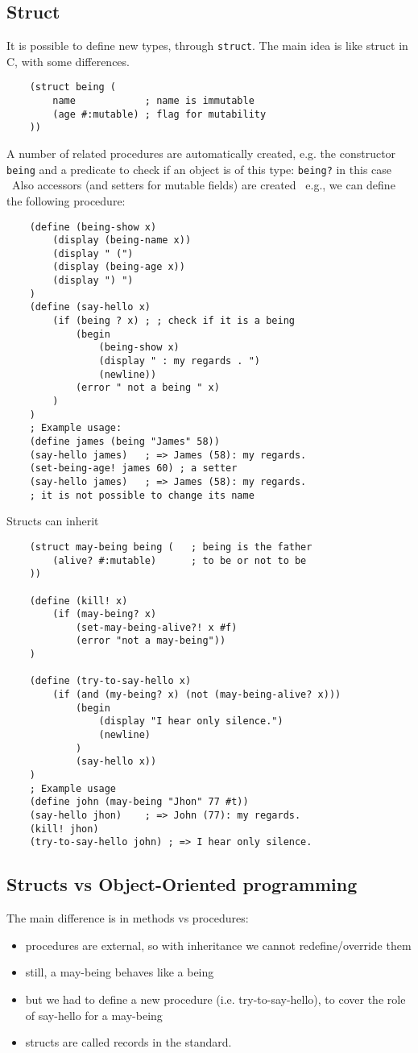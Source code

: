 \subsection{Struct}
It is possible to define new types, through \texttt{struct}.
The main idea is like struct in C, with some differences.
\begin{lstlisting}
    (struct being (
        name            ; name is immutable
        (age #:mutable) ; flag for mutability
    ))
\end{lstlisting}
A number of related procedures are automatically created, e.g. the constructor \texttt{being} and a predicate to check if an object is of this type: \texttt{being?} in this case \
Also accessors (and setters for mutable fields) are created \
e.g., we can define the following procedure:
\begin{lstlisting}
    (define (being-show x)
        (display (being-name x))
        (display " (")
        (display (being-age x))
        (display ") ")
    )
    (define (say-hello x)
        (if (being ? x) ; ; check if it is a being
            (begin
                (being-show x)
                (display " : my regards . ")
                (newline))
            (error " not a being " x)
        )
    )
    ; Example usage:
    (define james (being "James" 58))
    (say-hello james)   ; => James (58): my regards.
    (set-being-age! james 60) ; a setter
    (say-hello james)   ; => James (58): my regards.
    ; it is not possible to change its name
\end{lstlisting}
Structs can inherit
\begin{lstlisting}
    (struct may-being being (   ; being is the father
        (alive? #:mutable)      ; to be or not to be
    ))

    (define (kill! x)
        (if (may-being? x)
            (set-may-being-alive?! x #f)
            (error "not a may-being"))
    )

    (define (try-to-say-hello x)
        (if (and (my-being? x) (not (may-being-alive? x)))
            (begin
                (display "I hear only silence.")
                (newline)
            )
            (say-hello x))
    )
    ; Example usage
    (define john (may-being "Jhon" 77 #t))
    (say-hello jhon)    ; => John (77): my regards.
    (kill! jhon)
    (try-to-say-hello john) ; => I hear only silence.
\end{lstlisting}

\subsection{Structs vs Object-Oriented programming}
The main difference is in methods vs procedures:
\begin{itemize}
    \item procedures are external, so with inheritance we cannot redefine/override them
    \item still, a may-being behaves like a being
    \item but we had to define a new procedure (i.e. try-to-say-hello), to cover the role of say-hello for a may-being
    \item structs are called records in the standard.
\end{itemize}


